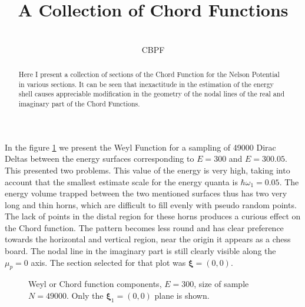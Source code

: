 \documentclass[a4paper,12pt]{article}
\title{ A Collection of Chord Functions}
\author{\\CBPF}
\newcommand{\xifase}{ {\boldsymbol{\xi}} }
\begin{document}
\maketitle

\begin{abstract}

Here I present a collection of sections of the Chord Function for
the Nelson Potential in various sections. It can be seen that
inexactitude in the estimation of the energy shell causes appreciable
modification in the geometry of the nodal lines of the real and
imaginary part of the Chord Functions.

\end{abstract}

In the figure \ref{LD} we present the Weyl Function for
a sampling of 49000 Dirac Deltas between the energy surfaces corresponding
to $E=300$ and $E=300.05$.
 This presented two problems. This value of the energy is very
high, taking into account that the smallest estimate scale 
for the energy quanta is $\hbar\omega_1=0.05$.  The energy volume
trapped between the two mentioned surfaces thus has two very long and 
thin horns, which are difficult to fill evenly with pseudo random
points. The lack of points in the distal region for these horns produces
a curious effect on the Chord function. The pattern becomes less
round and has clear preference towards the horizontal and vertical
region, near the origin it appears as a chess board. The nodal
line in the imaginary part is still clearly visible along the
$\mu_p=0$ axis.
The section selected for that plot was $\xifase=(0,0)$.


\begin{figure}[H]
\begin{center}
\caption{Weyl or Chord function components, $E=300$, size of
sample $N=49000$. Only the $\xifase_1=(0,0)$ plane is shown.}
\label{LD}
\end{center}
\end{figure}
\end{document}
